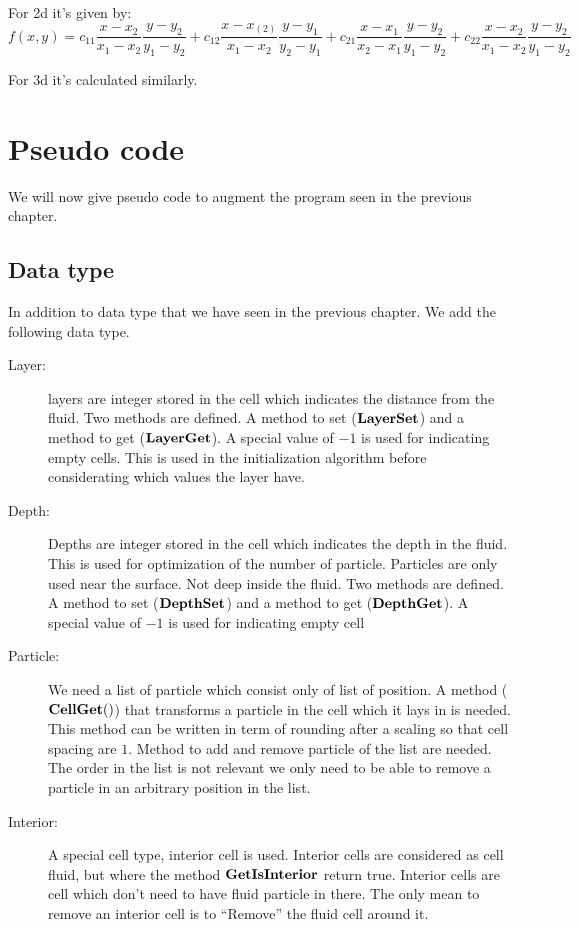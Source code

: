 For 2d it's given by:
\begin{equation}
	f(x,y)=c_{11}\frac{x-x_{2}}{x_{1}-x_{2}}\frac{y-y_{2}}{y_{1}-y_{2}}+c_{12}\frac{x-x_(2)}{x_{1}-x_{2}}\frac{y-y_{1}}{y_{2}-y_{1}}
	+c_{21}\frac{x-x_{1}}{x_{2}-x_{1}}\frac{y-y_{2}}{y_{1}-y_{2}}+c_{22}\frac{x-x_{2}}{x_{1}-x_{2}}\frac{y-y_{2}}{y_{1}-y_{2}}
\end{equation}

For 3d it's calculated similarly.

\section{Pseudo code}

We will now give pseudo code to augment the program seen in the previous chapter.

\subsection{Data type}

In addition to data type that we have seen in the previous chapter. We add the following data type.

\begin{description}
\item[Layer:]
layers are integer stored in the cell which indicates the distance from the fluid.
Two methods are defined. A method to set ($\mathop{\textbf{LayerSet}}$) and a method to get ($\mathop{\textbf{LayerGet}}$).
A special value of $-1$ is used for indicating empty cells. This is used in the initialization algorithm before considerating
which values the layer have.
\item[Depth:]
Depths are integer stored in the cell which indicates the depth in the fluid.
This is used for optimization of the number of particle. Particles are only used near the surface.
Not deep inside the fluid.
Two methods are defined. A method to set ($\mathop{\textbf{DepthSet}}$) and a method to get ($\mathop{\textbf{DepthGet}}$).
A special value of $-1$ is used for indicating empty cell
\item[Particle:]
We need a list of particle which consist only of list of position.
A method ($\mathop{\textbf{CellGet}}()$) that transforms a particle in the cell which it lays in is needed.
This method can be written in term of rounding after a scaling so that cell spacing are $1$.
Method to add and remove particle of the list are needed.
The order in the list is not relevant we only need to be able to remove a particle in an arbitrary position in the list.
\item[Interior:]
A special cell type, interior cell is used.
Interior cells are considered as cell fluid, but where the method $\mathop{\textbf{GetIsInterior}}$ return true.
Interior cells are cell which don't need to have fluid particle in there.
The only mean to remove an interior cell is to ``Remove'' the fluid cell around it.
\end{description}

